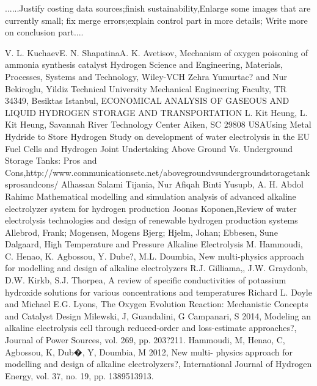 ......Justify costing data sources;finish sustainability,Enlarge some images that are currently small; fix merge errors;explain control part in more details; Write more on conclusion part....

\singlespacing
\begin{thebibliography}{9}
\linespread{1} 
V. L. KuchaevE. N. ShapatinaA. K. Avetisov, Mechanism of oxygen poisoning of ammonia synthesis catalyst
Hydrogen Science and Engineering, Materials, Processes, Systems and Technology, Wiley-VCH
Zehra Yumurtac? and Nur Bekiroglu, Yildiz Technical University Mechanical Engineering Faculty, TR 34349, Besiktas Istanbul, ECONOMICAL ANALYSIS OF GASEOUS AND LIQUID HYDROGEN STORAGE AND TRANSPORTATION
L. Kit Heung, L. Kit Heung, Savannah River Technology Center Aiken, SC 29808 USAUsing Metal Hydride to Store Hydrogen
Study on development of water electrolysis in the EU Fuel Cells and Hydrogen Joint Undertaking
Above Ground Vs. Underground Storage Tanks: Pros and Cons,http://www.communicationsetc.net/above\-ground\-vs\-underground\-storage\-tanks\-pros\-and\-cons/
Alhassan Salami Tijania, Nur Afiqah Binti Yusupb, A. H. Abdol Rahimc
Mathematical modelling and simulation analysis of advanced alkaline electrolyzer system for hydrogen production
Joonas Koponen,Review of water electrolysis technologies and design of renewable hydrogen production systems
Allebrod, Frank; Mogensen, Mogens Bjerg; Hjelm, Johan; Ebbesen, Sune Dalgaard, High Temperature and Pressure Alkaline Electrolysis
M. Hammoudi, C. Henao, K. Agbossou, Y. Dube?, M.L. Doumbia, New multi-physics approach for modelling and design of alkaline electrolyzers
R.J. Gilliama,, J.W. Graydonb, D.W. Kirkb, S.J. Thorpea, A review of specific conductivities of potassium hydroxide solutions for various concentrations and temperatures
Richard L. Doyle and Michael E.G. Lyons, The Oxygen Evolution Reaction: Mechanistic Concepts and Catalyst Design
Milewski, J, Guandalini, G  Campanari, S 2014, Modeling an alkaline electrolysis cell through reduced-order and loss-estimate approaches?, Journal of Power Sources, vol. 269, pp. 203?211.
Hammoudi, M, Henao, C, Agbossou, K, Dub�, Y, Doumbia, M 2012, New multi- physics approach for modelling and design of alkaline electrolyzers?, International Journal of Hydrogen Energy, vol. 37, no. 19, pp. 1389513913.

\end{thebibliography}
